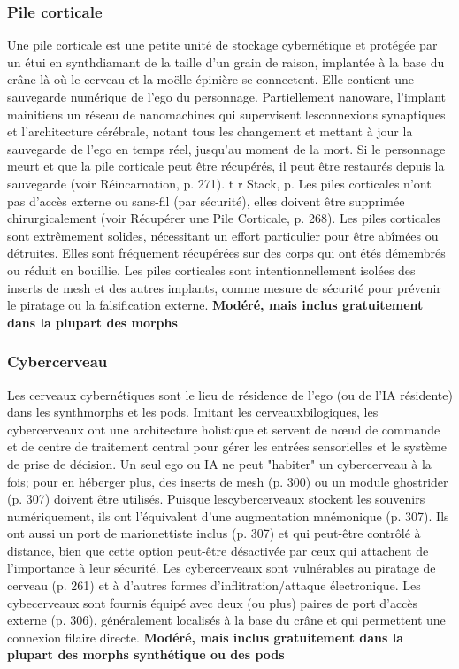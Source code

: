 \subsubsection{Pile corticale} Une pile corticale est une petite unité de stockage cybernétique et protégée par un étui en synthdiamant de la taille d'un grain de raison, implantée à la base du crâne là où le cerveau et la moëlle épinière se connectent. Elle contient une sauvegarde numérique de l'ego du personnage. Partiellement nanoware, l'implant mainitiens un réseau de nanomachines qui supervisent lesconnexions synaptiques et l'architecture cérébrale, notant tous les changement et mettant à jour la sauvegarde de l'ego en temps réel, jusqu'au moment de la mort. Si le personnage meurt et que la pile corticale peut être récupérés, il peut être restaurés depuis la sauvegarde (voir Réincarnation, p. 271). t r Stack, p.
Les piles corticales n'ont pas d'accès externe ou sans-fil (par sécurité), elles doivent être supprimée chirurgicalement (voir Récupérer une Pile Corticale, p. 268). Les piles corticales sont extrêmement solides, nécessitant un effort particulier pour être abîmées ou détruites. Elles sont fréquement récupérées sur des corps qui ont étés démembrés ou réduit en bouillie. Les piles corticales sont intentionnellement isolées des inserts de mesh et des autres implants, comme mesure de sécurité pour prévenir le piratage ou la falsification externe. \textbf{{Modéré, mais inclus gratuitement dans la plupart des morphs}} 

\subsubsection{Cybercerveau} 

Les cerveaux cybernétiques sont le lieu de résidence de l'ego (ou de l'IA résidente) dans les synthmorphs et les pods. Imitant les cerveauxbilogiques, les cybercerveaux ont une architecture holistique et servent de nœud de commande et de centre de traitement central pour gérer les entrées sensorielles et le système de prise de décision. Un seul ego ou IA ne peut "habiter" un cybercerveau à la fois; pour en héberger plus, des inserts de mesh (p. 300) ou un module ghostrider (p. 307) doivent être utilisés. Puisque lescybercerveaux stockent les souvenirs numériquement, ils ont l'équivalent d'une augmentation mnémonique (p. 307). Ils ont aussi un port de marionettiste inclus (p. 307) et qui peut-être contrôlé à distance, bien que cette option peut-être désactivée par ceux qui attachent de l'importance à leur sécurité. Les cybercerveaux sont vulnérables au piratage de cerveau (p. 261) et à d'autres formes d'inflitration/attaque électronique. Les cybecerveaux sont fournis équipé avec deux  (ou plus) paires de port d'accès externe (p. 306), généralement localisés à la base du crâne et qui permettent une connexion filaire directe. \textbf{{Modéré, mais inclus gratuitement dans la plupart des morphs synthétique ou des pods}} 

